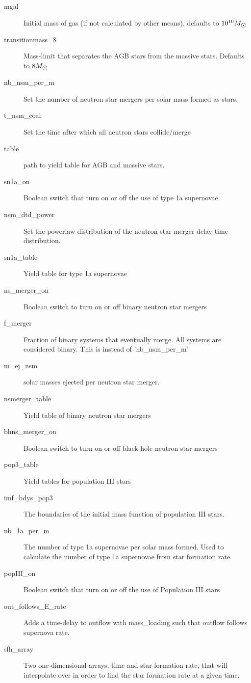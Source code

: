 \begin{description}
\item[mgal] Initial mass of gas (if not calculated by other means), defaults to $10^{10} \msol$
\item[transitionmass=8]
  Mass-limit that separates the AGB stars from the massive stars.
  Defaults to $8\msol$
\item[nb\_nsm\_per\_m] Set the number of neutron star mergers per solar mass formed as stars.
\item[t\_nsm\_coal] Set the time after which all neutron stars collide/merge
\item[table] path to yield table for AGB and massive stars.
\item[sn1a\_on] Boolean switch that turn on or off the use of type 1a supernovae.
\item[nsm\_dtd\_power] Set the powerlaw distribution of the neutron star merger delay-time distribution.
\item[sn1a\_table] Yield table for type 1a supernovae
\item[ns\_merger\_on] Boolean switch to turn on or off binary neutron star mergers
\item[f\_merger] Fraction of binary systems that eventually merge. All systems are considered binary. This is instead of 'nb\_nsm\_per\_m'
\item[m\_ej\_nsm] solar masses ejected per neutron star merger.
\item[nsmerger\_table] Yield table of binary neutron star mergers
\item[bhns\_merger\_on] Boolean switch to turn on or off black hole neutron star mergers
\item[pop3\_table] Yield tables for population III stars
\item[imf\_bdys\_pop3] The boundaries of the initial mass function of population III stars.
\item[nb\_1a\_per\_m] The number of type 1a supernovae per solar mass formed.
  Used to calculate the number of type 1a supernovae from star formation rate.
\item[popIII\_on] Boolean switch that turn on or off the use of Population III stars
\item[out\_follows\_E\_rate] Adds a time-delay to outflow with mass\_loading such that outflow follows supernova rate.
\item[sfh\_array] Two one-dimensional arrays, time and star formation rate, that \omegamodel will interpolate over in order to find the star formation rate at a given time.
\end{description}
